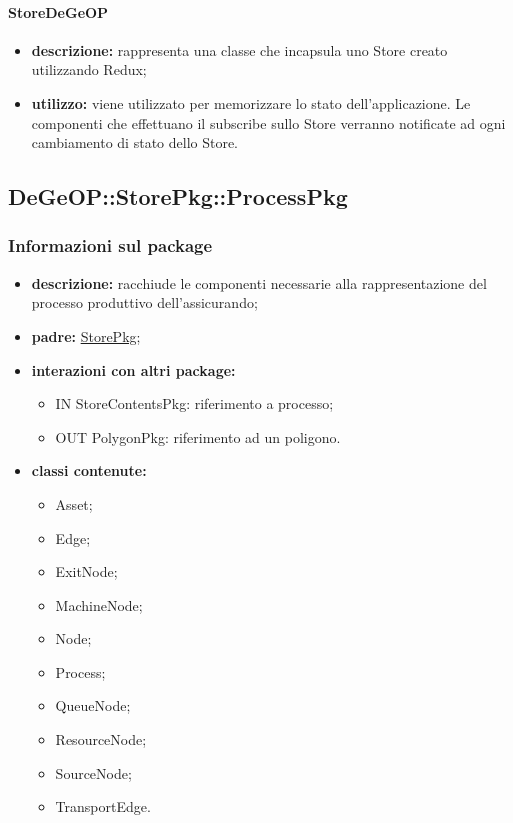 \paragraph{StoreDeGeOP}
\begin{itemize}
	\item \textbf{descrizione:} rappresenta una classe che incapsula uno Store creato utilizzando Redux;
	\item \textbf{utilizzo:} viene utilizzato per memorizzare lo stato dell'applicazione.
	Le componenti che effettuano il subscribe sullo Store verranno notificate ad ogni cambiamento di stato dello Store.
\end{itemize}
\newpage
\subsection{DeGeOP::StorePkg::ProcessPkg}
\label{pkg::ProcessPkg}
\subsubsection{Informazioni sul package}
\begin{itemize}
	\item \textbf{descrizione:} racchiude le componenti necessarie alla rappresentazione del processo produttivo dell'assicurando;
	\item \textbf{padre:} \hyperref[pkg::StorePkg]{StorePkg};
	\item \textbf{interazioni con altri package:} 
	\begin{itemize}
		\item IN StoreContentsPkg: riferimento a processo;
		\item OUT PolygonPkg: riferimento ad un poligono.
	\end{itemize}
	\item \textbf{classi contenute:}
	\begin{itemize}
		\item Asset;
		\item Edge;
		\item ExitNode;
		\item MachineNode;
		\item Node;
		\item Process;
		\item QueueNode;
		\item ResourceNode;
		\item SourceNode;
		\item TransportEdge.
	\end{itemize}
\end{itemize}
